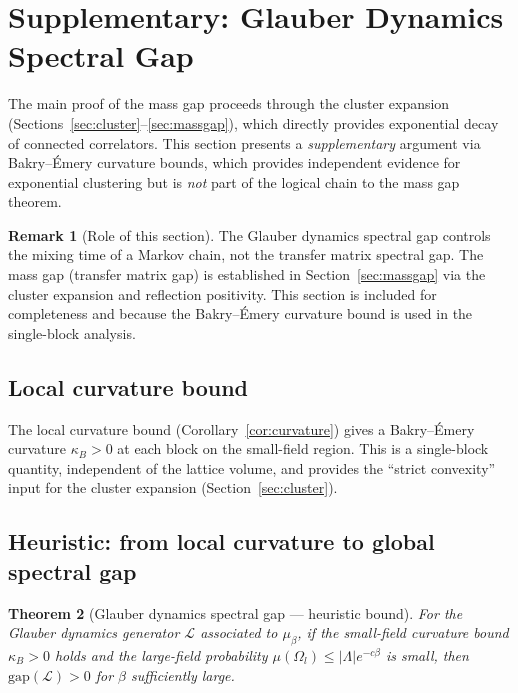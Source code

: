 \documentclass[11pt]{article}
\newtheorem{theorem}{Theorem}[section]
\theoremstyle{definition}
\newtheorem{remark}[theorem]{Remark}
\begin{document}
\section{Supplementary: Glauber Dynamics Spectral Gap}\label{sec:global}

The main proof of the mass gap proceeds through the cluster expansion
(Sections~\ref{sec:cluster}--\ref{sec:massgap}), which directly
provides exponential decay of connected correlators.  This section
presents a \emph{supplementary} argument via Bakry--\'Emery curvature
bounds, which provides independent evidence for exponential clustering
but is \emph{not} part of the logical chain to the mass gap theorem.

\begin{remark}[Role of this section]
\label{rem:sec4-role}
The Glauber dynamics spectral gap controls the mixing time of a
Markov chain, not the transfer matrix spectral gap.  The mass gap
(transfer matrix gap) is established in Section~\ref{sec:massgap}
via the cluster expansion and reflection positivity.  This section
is included for completeness and because the Bakry--\'Emery
curvature bound is used in the single-block analysis.
\end{remark}

\subsection{Local curvature bound}

The local curvature bound (Corollary~\ref{cor:curvature}) gives a
Bakry--\'Emery curvature $\kappa_B>0$ at each block on the
small-field region.  This is a single-block quantity,
independent of the lattice volume, and provides the
``strict convexity'' input for the cluster expansion
(Section~\ref{sec:cluster}).

\subsection{Heuristic: from local curvature to global spectral gap}

\begin{theorem}[Glauber dynamics spectral gap --- heuristic bound]
\label{thm:poincare}
For the Glauber dynamics generator $\mathcal{L}$ associated
to $\mu_\beta$, if the small-field curvature bound
$\kappa_B>0$ holds and the large-field probability
$\mu(\Omega_l)\le|\Lambda|e^{-c\beta}$ is small, then
$\mathrm{gap}(\mathcal{L})>0$ for $\beta$ sufficiently large.
\end{theorem}
\end{document}
